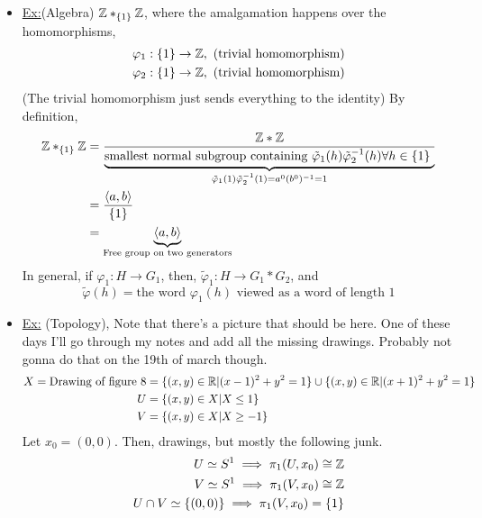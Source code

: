 \documentclass[../notes.tex]{subfiles}
\begin{document}
\begin{itemize}
    \item \underline{Ex:}(Algebra) $\mathbb{Z}*_{\{1\}}\mathbb{Z}$, where the amalgamation happens
        over the homomorphisms,
        \begin{align*}
            \varphi_1: \{1\} \rightarrow \mathbb{Z},\ \text{(trivial homomorphism)}\\
            \varphi_2: \{1\} \rightarrow \mathbb{Z},\ \text{(trivial homomorphism)}\\
        \end{align*}
        (The trivial homomorphism just sends everything to the identity)
        By definition,
        \begin{align*}
            \mathbb{Z}*_{\{1\}}\mathbb{Z} &= \frac{\mathbb{Z} * \mathbb{Z}}{
                \underbrace{\text{smallest normal subgroup containing $
                    \tilde{\varphi}_1(h)\tilde{\varphi}_2^{-1}(h)\forall h\in\{1\}$
                }
                }_{\tilde{\varphi}_1(1)\tilde{\varphi}_2^{-1}(1)=a^0(b^0)^{-1}=1}
            }\\
            &=\frac{\langle a,b \rangle}{\{1\}}\\
            &=\underbrace{\langle a,b \rangle}_{\text{Free group on two generators}}
        \end{align*}
        In general, if $\varphi_1:H\rightarrow G_1$, then, 
        $\tilde{\varphi}_1:H\rightarrow G_1 * G_2$, and 
        \[
            \tilde{\varphi}(h)=\text{the word $\varphi_1(h)$ viewed as a word of length 1}
        \]
    \item \underline{Ex:} (Topology), Note that there's a picture that should be here.
        One of these days I'll go through my notes and add all the missing drawings. Probably
        not gonna do that on the 19th of march though.
        \begin{align*}
            X = \text{Drawing of figure 8}&=\{(x,y)\in \mathbb{R}|(x-1)^2+y^2=1\}\cup
            \{(x,y)\in \mathbb{R}|(x+1)^2+y^2=1\}\\
            U&=\{(x,y)\in X|X\le 1\}\\
            V&=\{(x,y)\in X|X\ge -1\}\\
        \end{align*}
        Let $x_0=(0,0)$. Then, drawings, but mostly the following junk.
        \begin{align*}
            U\simeq S^1\implies \pi_1(U, x_0)\cong \Z\\
            V\simeq S^1\implies \pi_1(V, x_0)\cong \Z\\
            U\cap V\simeq \{(0,0)\}\implies \pi_1(V, x_0)=\{1\}\\

\end{align*}
\end{itemize}
\end{document}
